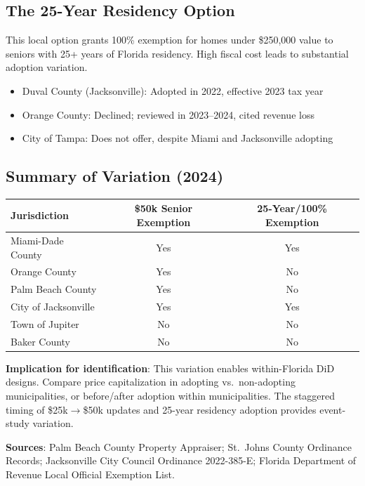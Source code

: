 \documentclass[11pt]{article}
\begin{document}
\subsection{The 25-Year Residency Option}

This local option grants 100\% exemption for homes under \$250,000 value to seniors with 25+ years of Florida residency. High fiscal cost leads to substantial adoption variation.

\begin{itemize}
    \item Duval County (Jacksonville): Adopted in 2022, effective 2023 tax year
    \item Orange County: Declined; reviewed in 2023--2024, cited revenue loss
    \item City of Tampa: Does not offer, despite Miami and Jacksonville adopting
\end{itemize}

\subsection{Summary of Variation (2024)}

\begin{center}
\begin{tabular}{lcc}
\toprule
Jurisdiction & \$50k Senior Exemption & 25-Year/100\% Exemption \\
\midrule
Miami-Dade County & Yes & Yes \\
Orange County & Yes & No \\
Palm Beach County & Yes & No \\
City of Jacksonville & Yes & Yes \\
Town of Jupiter & No & No \\
Baker County & No & No \\
\bottomrule
\end{tabular}
\end{center}

\textbf{Implication for identification}: This variation enables within-Florida DiD designs. Compare price capitalization in adopting vs.\ non-adopting municipalities, or before/after adoption within municipalities. The staggered timing of \$25k$\to$\$50k updates and 25-year residency adoption provides event-study variation.

\textbf{Sources}: Palm Beach County Property Appraiser; St.\ Johns County Ordinance Records; Jacksonville City Council Ordinance 2022-385-E; Florida Department of Revenue Local Official Exemption List.
\end{document}

